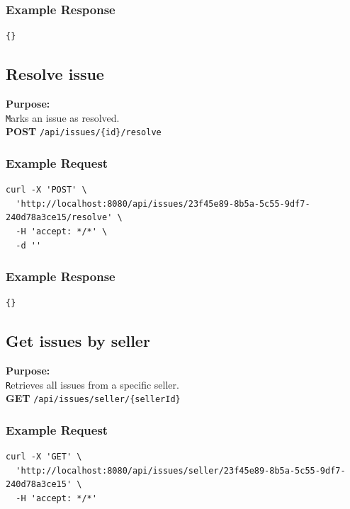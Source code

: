 \documentclass[a4paper,11pt]{article}
\begin{document}
\subsubsection*{Example Response}
\begin{lstlisting}
{}
\end{lstlisting}

\subsection{Resolve issue}
\textbf{Purpose:} \\ \texttt Marks an issue as resolved. \\

\textbf{POST} \texttt{/api/issues/\{id\}/resolve}

\subsubsection*{Example Request}
\begin{lstlisting}
curl -X 'POST' \
  'http://localhost:8080/api/issues/23f45e89-8b5a-5c55-9df7-240d78a3ce15/resolve' \
  -H 'accept: */*' \
  -d ''
\end{lstlisting}

\subsubsection*{Example Response}
\begin{lstlisting}
{}
\end{lstlisting}

\subsection{Get issues by seller}
\textbf{Purpose:} \\ \texttt Retrieves all issues from a specific seller. \\

\textbf{GET} \texttt{/api/issues/seller/\{sellerId\}}

\subsubsection*{Example Request}
\begin{lstlisting}
curl -X 'GET' \
  'http://localhost:8080/api/issues/seller/23f45e89-8b5a-5c55-9df7-240d78a3ce15' \
  -H 'accept: */*'
\end{lstlisting}
\end{document}
